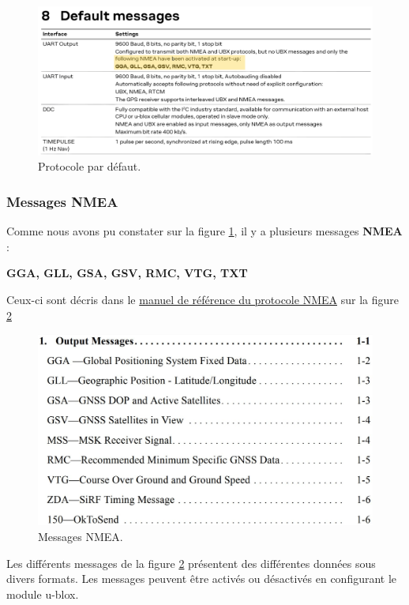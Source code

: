 \begin{figure}[!h]
	\centering
	\includegraphics[width=0.7\linewidth]{../figures/code/Default-messages}
	\caption{Protocole par défaut.}
	\label{fig:default-messages}
\end{figure}

\clearpage

\subsubsection{Messages NMEA}
Comme nous avons pu constater sur la figure \ref{fig:default-messages}, il y a plusieurs messages \textbf{NMEA} : 

\textbf{GGA, GLL, GSA, GSV, RMC, VTG, TXT}

Ceux-ci sont décris dans le \href{https://www.ekf.de/c/cgps/cg2/inf/nmea_reference_manual.pdf}{manuel de référence du protocole NMEA} sur la figure \ref{fig:messages-nmea}

\begin{figure}[h]
	\centering
	\includegraphics[width=0.55\linewidth]{../figures/code/Messages-NMEA}
	\caption{Messages NMEA.}
	\label{fig:messages-nmea}
\end{figure}

Les différents messages de la figure \ref{fig:messages-nmea} présentent des différentes données sous divers formats. Les messages peuvent être activés ou désactivés en configurant le module u-blox.

